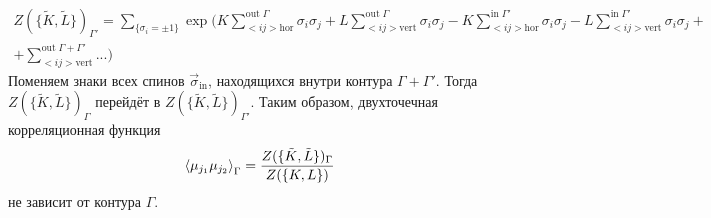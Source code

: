 \documentclass[12pt]{article}
\theoremstyle{definition}
\begin{document}
\begin{enumerate}
\begin{itemize}
\begin{multline}
        \end{multline}
        \begin{multline}
            Z(\{\tilde K,\tilde L\})_{\Gamma'}=\sum\limits_{\{\sigma_i=\pm1\}}\exp(K\sum\limits_{<ij>\text{hor}}^{\text{out}\;\Gamma}\sigma_i\sigma_j+L\sum\limits_{<ij>\text{vert}}^{\text{out}\;\Gamma}\sigma_i\sigma_j-K\sum\limits_{<ij>\text{hor}}^{\text{in}\;\Gamma'}\sigma_i\sigma_j-L\sum\limits_{<ij>\text{vert}}^{\text{in}\;\Gamma'}\sigma_i\sigma_j+\\+\sum\limits_{<ij>\text{vert}}^{\text{out}\;\Gamma+\Gamma'}...)
        \end{multline}
        Поменяем знаки всех спинов $\vec{\sigma}_\text{in}$, находящихся внутри контура $\Gamma+\Gamma'$. Тогда $Z(\{\tilde K,\tilde L\})_{\Gamma}$ перейдёт в $Z(\{\tilde K,\tilde L\})_{\Gamma'}$.
        Таким образом, двухточечная корреляционная функция
        \begin{equation}
            \braket{\mu_{j_1}\mu_{j_2}}_\Gamma=\frac{Z(\{\tilde K,\tilde L\})_\Gamma}{Z(\{K,L\})}
        \end{equation}
        не зависит от контура $\Gamma$.
    \end{itemize}
\end{enumerate}
\end{document}
